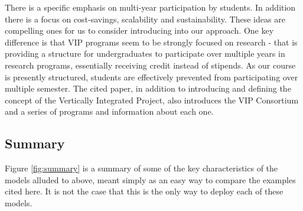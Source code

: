 There is a specific emphasis on multi-year participation by students. In addition there is a focus on cost-savings, scalability and sustainability. These ideas are compelling ones for us to consider introducing into our approach. One key difference is that VIP programs seem to be strongly focused on research - that is providing a structure for undergraduates to participate over multiple years in research programs, essentially receiving credit instead of stipends. As our course is presently structured, students are effectively prevented from participating over multiple semester. The cited paper, in addition to introducing and defining the concept of the Vertically Integrated Project, also introduces the VIP Consortium \cite{VIPSite} and a series of programs and information about each one.

\subsection{Summary}
Figure \ref{fig:summary} is a summary of some of the key characteristics of the models alluded to above, meant simply as an easy way to compare the examples cited here. It is not the case that this is the only way to deploy each of these models.

